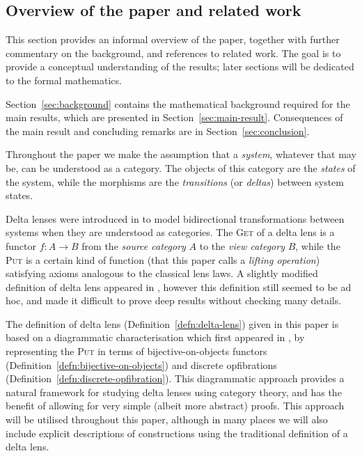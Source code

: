 \documentclass[colorlinks = true, a4paper, oneside, reqno, 11pt]{amsart}
\theoremstyle{definition}
\theoremstyle{remark}
\begin{document}
\subsection*{Overview of the paper and related work}

This section provides an informal overview of the paper, together 
with further commentary on the background, and references to related 
work. 
The goal is to provide a conceptual understanding of the results;
later sections will be dedicated to the formal mathematics.

Section~\ref{sec:background} contains the mathematical background 
required for the main results, which are presented in 
Section~\ref{sec:main-result}. 
Consequences of the main result and concluding remarks are in 
Section~\ref{sec:conclusion}.

Throughout the paper we make the assumption that a \emph{system}, 
whatever that may be, can be understood as a category.
The objects of this category are the \emph{states} of the system, 
while the morphisms are the \emph{transitions} (or \emph{deltas}) 
between system states. 

Delta lenses were introduced in \cite[Definition~4]{DXC11} to 
model bidirectional transformations between systems when they are 
understood as categories. 
The \textsc{Get} of a delta lens is a functor 
$f \colon A \rightarrow B$ from the \emph{source category} $A$ to 
the \emph{view category} $B$, while the \textsc{Put} is a certain kind of 
function (that this paper calls a \emph{lifting operation}) 
satisfying axioms analogous to the classical lens laws. 
A slightly modified definition of delta lens appeared in 
\cite[Definition~1]{JR13}, however this definition
still seemed to be ad hoc, and made it difficult to prove deep results
without checking many details.

The definition of delta lens (Definition~\ref{defn:delta-lens}) 
given in this paper is based on a diagrammatic characterisation 
which first appeared in \cite[Corollary~20]{Cla20}, by 
representing the \textsc{Put} in terms of 
bijective-on-objects functors (Definition~\ref{defn:bijective-on-objects})
and discrete opfibrations (Definition~\ref{defn:discrete-opfibration}). 
This diagrammatic approach provides a natural framework for 
studying delta lenses using category theory, and has the benefit of 
allowing for very simple (albeit more abstract) proofs. 
This approach will be utilised throughout this paper, 
although in many places we will also include explicit 
descriptions of constructions using the traditional definition of a 
delta lens. 
\end{document}
